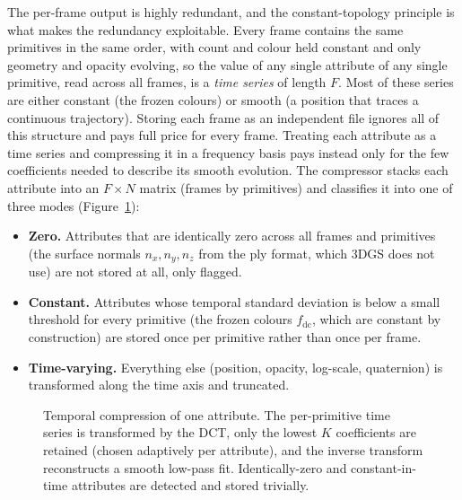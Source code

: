 The per-frame output is highly redundant, and the
constant-topology principle is what makes the redundancy exploitable. Every frame
contains the same primitives in the same order, with count and colour
held constant and only geometry and opacity evolving, so the value of any single
attribute of any single primitive, read across all frames, is a \emph{time series} of
length $F$. Most of these series are either constant (the frozen colours) or smooth (a position that traces a continuous
trajectory). Storing each frame as an independent file ignores all of this structure
and pays full price for every frame. Treating each attribute as a time series and
compressing it in a frequency basis pays instead only for the few coefficients needed
to describe its smooth evolution. The compressor stacks each attribute into an $F \times N$ matrix (frames by
primitives) and classifies it into one of three modes
(Figure~\ref{fig:compression}):
\begin{itemize}
    \item \textbf{Zero.} Attributes that are identically zero across all frames and
    primitives (the surface normals $n_x, n_y, n_z$ from the ply format, which 3DGS does not use) are not stored at all, only flagged.
    \item \textbf{Constant.} Attributes whose temporal standard deviation is below a
    small threshold for every primitive (the frozen colours $f_{\mathrm{dc}}$, which are
    constant by construction) are stored once per primitive rather than once per frame.
    \item \textbf{Time-varying.} Everything else (position, opacity, log-scale,
    quaternion) is transformed along the time axis and truncated.
\end{itemize}

\begin{figure}[t]
    \centering
    \resizebox{\linewidth}{!}{}
    \caption{Temporal compression of one attribute. The per-primitive time
    series is
    transformed by the DCT, only the lowest $K$ coefficients are retained (chosen
    adaptively per attribute), and the inverse transform reconstructs a smooth
    low-pass fit. Identically-zero and constant-in-time attributes are detected and
    stored trivially.}
    \label{fig:compression}
\end{figure}

